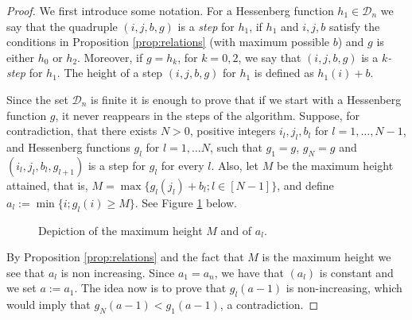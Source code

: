 \documentclass[10pt]{amsart}
\theoremstyle{definition}
\newcommand{\D}{\mathcal{D}}
\newcommand{\dyckpath}[2]{
\draw[line width=2pt] (#1) foreach \dir in {#2}{ -- ++(\dir*90:1)};
}
\newcommand{\gline}[4]{
\draw[line width=#4 pt, color=#3] (#1) -- (#2);
}
\begin{document}
\begin{proof}
We first introduce some notation. For a Hessenberg function $h_1\in \D_n$ we say that the quadruple $(i,j,b,g)$ is a \emph{step} for $h_1$, if $h_1$ and $i,j,b$ satisfy the conditions in Proposition \ref{prop:relations} (with maximum possible $b$) and $g$ is either $h_0$ or $h_2$. Moreover, if $g=h_k$, for $k=0,2$, we say that $(i,j,b,g)$ is a \emph{$k$-step} for $h_1$. The height of a step $(i,j,b,g)$ for $h_1$ is defined as $h_1(i)+b$.


Since the set $\D_{n}$ is finite it is enough to prove that if we start with a Hessenberg function $g$, it never reappears in the steps of the algorithm. Suppose, for contradiction, that there exists $N>0$, positive integers $i_l,j_l, b_l$ for $l=1,\ldots, N-1$, and Hessenberg functions $g_l$ for $l=1,\ldots N$, such that $g_1=g$, $g_N=g$ and $(i_l,j_l,b_l,g_{l+1})$ is a step for $g_l$ for every $l$. Also, let $M$ be the maximum height attained, that is, $M=\max\{ g_l(j_l)+b_l;l\in [N-1]\}$, and define $a_l:=\min\{i; g_l(i)\geq M\}$. See Figure \ref{fig:Ma} below.
\begin{figure}[htb]  \centering
{}
\caption{Depiction of the maximum height $M$ and of $a_l$.}
\label{fig:Ma}
\end{figure}

By Proposition \ref{prop:relations} and the fact that $M$ is the maximum height we see that $a_l$ is non increasing. Since $a_1=a_n$, we have that $(a_l)$ is constant and we set $a:=a_1$. The idea now is to prove that $g_l(a-1)$ is non-increasing, which would imply that $g_N(a-1)<g_1(a-1)$, a contradiction.\par







\end{proof}
\end{document}
